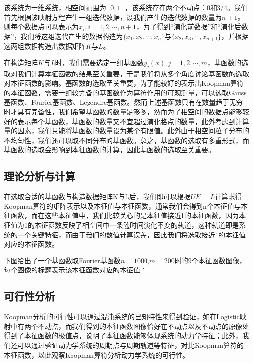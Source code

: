 该系统为一维系统，相空间范围为$[0,1]$，该系统存在两个不动点：$0$和$3/4$。我们首先根据该映射方程产生一组迭代数据，设我们产生的迭代数据的数量为$n+1$。则每个数据点可以表示为$x_i,i=1,2,\cdots,n+1$，为了得到“演化前数据”和“演化后数据”，我们将这组迭代产生的数据构造为$\{x_1,x_2,\cdots,x_n\}$与$\{x_2,x_3,\cdots,x_{n+1}\}$，并根据这两组数据构造出数据矩阵$K$与$L$。

在构造矩阵$K$与$L$时，我们需要选定一组基函数${g_j(x)},j=1,2,\cdots,m$，基函数的选取对我们计算本征函数的结果至关重要，于是我们将从多个角度讨论基函数的选取对本征函数的影响。基函数的选取至关重要，为了能较好的表示出Koopman算符的本征函数，需要一组较完备的基函数作为算符作用的可观测量，可以选取Gauss基函数、Fourier基函数、Legendre基函数。然而上述基函数只有在数量趋于无穷时才具有完备性，我们希望基函数的数量足够多，然而为了相空间的数据点能够较好的表示每个基函数，基函数的数量又不宜超过演化格点的数量，此外考虑到计算量的因素，我们只能将基函数的数量设为某个有限值。此外由于相空间粒子分布的不均匀性，我们还可以取不同分布的基函数。总之，基函数的选取有多重形式，而基函数的选取会影响到本征函数的计算，因此基函数的选取至关重要。

\subsection{理论分析与计算}
在选取合适的基函数与构造数据矩阵K与L后，我们即可以根据$UK=L$计算求得Koopman算符的矩阵表示以及本征值与本征函数，通常我们会得到n个本征值与本征函数，而在这些本征值中，我们比较关心的是本征值接近1的本征函数，因为本征值为1的本征函数反映了相空间中一条随时间演化不变的轨道，这种轨道即是系统的一个关键特征，而由于我们的数值计算误差，因此我们将选取接近1的本征值对应的本征函数。

下图给出了一个基函数取Fourier基函数$n=1000$,$m=200$时的9个本征函数图像，每个图像的标题表示该本征函数对应的本征值：

\subsection{可行性分析}
Koopman分析的可行性可以通过混沌系统的已知特性来得到验证，如在Logistic映射中有两个不动点，而我们得到的本征函数图像恰好在不动点以及不动点的原像处得到了本征函数的极值点，说明了本征函数能够体现系统的动力学特征；此外，我们还可以通过验证动力学系统的周期点与周期轨道等特征，对比Koopman算符的本征函数，以此观察Koopman算符分析动力学系统的可行性。

